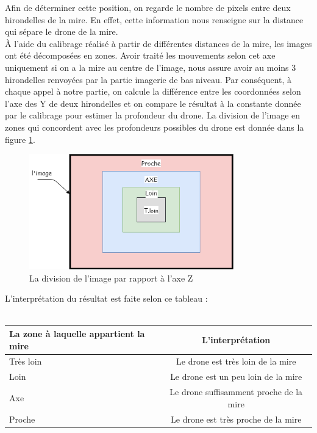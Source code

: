 \documentclass[12pt]{article}
\begin{document}
\begin{enumerate}
            Afin de déterminer cette position, on regarde le nombre de pixels entre deux hirondelles de la mire. En effet, cette information nous renseigne sur la distance qui sépare le drone de la mire.\\
            À l’aide du calibrage réalisé à partir de différentes distances de la mire, les images ont été décomposées en zones. Avoir traité les mouvements selon cet axe uniquement si on a la mire au centre de l’image, nous assure avoir au moins 3 hirondelles renvoyées par la partie imagerie de bas niveau. Par conséquent, à chaque appel à notre partie, on calcule la différence entre les coordonnées selon l'axe des Y de deux hirondelles et on compare le résultat à la constante donnée par le calibrage pour estimer la profondeur du drone.
            La division de l’image en zones qui concordent avec les profondeurs possibles du drone est donnée dans la figure
             \ref{fig:image7}.\\
            \begin{figure}[H]
            \centering
            \includegraphics[height=5cm]{image7.png}
            \caption{La division de l'image par rapport à l'axe Z}
            \label{fig:image7}
            \end{figure}
            L'interprétation du résultat est faite selon ce tableau :\\\\
            \begin{tabular}{|l|c|}
            \hline
            La zone à laquelle appartient la mire & L’interprétation\\
            \hline
            Très loin & Le drone est très loin de la mire  \\
            Loin & Le drone est un peu loin de la mire\\
            Axe & Le drone suffisamment proche de la mire \\
            Proche& Le drone est très proche de la mire \\
            \hline
            \end{tabular}\\\\
            

\end{enumerate}
\end{document}

